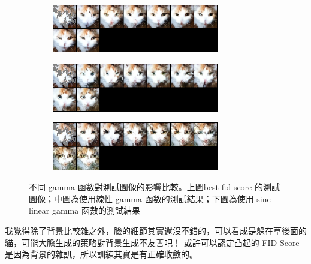 \begin{figure}[h]
    \centering
    \begin{subfigure}{\textwidth}
        \centering
        \includegraphics[width=0.8\textwidth]{figures/test_69.png}
        \label{fig:mask_test_69}
    \end{subfigure}
    \begin{subfigure}{\textwidth}
        \centering
        \includegraphics[width=0.8\textwidth]{figures/bad-linear-test_69.png}
        \label{fig:bad-linear-test_69}
    \end{subfigure}
    \begin{subfigure}{\textwidth}
        \centering
        \includegraphics[width=0.8\textwidth]{figures/bad-sine-linear-test_69.png}
        \label{fig:bad-sine-linear-test_69}
    \end{subfigure}
    \caption{不同 gamma 函數對測試圖像的影響比較。上圖best fid score 的測試圖像；中圖為使用線性 gamma 函數的測試結果；下圖為使用 sine linear gamma 函數的測試結果}
    \label{fig:gamma-comparison-test}
\end{figure}

我覺得除了背景比較雜之外，臉的細節其實還沒不錯的，可以看成是躲在草後面的貓，可能大膽生成的策略對背景生成不友善吧！ 或許可以認定凸起的 FID Score 是因為背景的雜訊，所以訓練其實是有正確收斂的。
